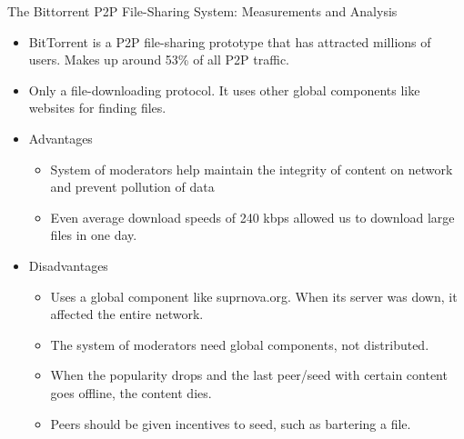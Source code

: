 \documentclass[9pt]{beamer}
\begin{document}
\begin{frame}{The Bittorrent P2P File-Sharing System: Measurements and Analysis}
    \begin{itemize}
        \item BitTorrent is a P2P file-sharing prototype that has attracted millions of users. Makes up around 53\% of all P2P traffic.
        \item Only a file-downloading protocol. It uses other global components like websites for finding files.
        \item Advantages
        \begin{itemize}
            \item System of moderators help maintain the integrity of content on network and prevent pollution of data
\item Even average download speeds of 240 kbps allowed us to download large files in one day. 

        \end{itemize}
        \item Disadvantages
        \begin{itemize}
            \item Uses a global component like suprnova.org. When its server was down, it affected the entire network.
\item The system of moderators need global components, not distributed. 
\item When the popularity drops and the last peer/seed with certain content goes offline, the content dies. 
\item Peers should be given incentives to seed, such as bartering a file.

        \end{itemize}
    \end{itemize}
\end{frame}
\end{document}

